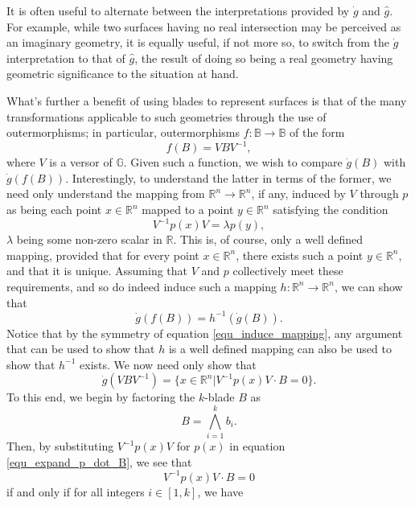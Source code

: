\documentclass{ecgd-l}
\theoremstyle{definition}
\theoremstyle{remark}
\numberwithin{equation}{section}
\newcommand{\R}{\mathbb{R}}
\newcommand{\B}{\mathbb{B}}
\newcommand{\G}{\mathbb{G}}
\newcommand{\gd}{\dot{g}}
\newcommand{\gh}{\hat{g}}
\begin{document}
It is often useful to alternate between the interpretations provided by $\gd$ and $\gh$.
For example, while two surfaces having no real intersection may be perceived as an imaginary
geometry, it is equally useful, if not more so, to switch from the $\gd$ interpretation to that of $\gh$,
the result of doing so being a real geometry having geometric significance to the situation at hand.

What's further a benefit of using blades to represent surfaces is that of the many transformations
applicable to such geometries through the use of outermorphisms; in particular,
outermorphisms $f:\B\to\B$ of the form
\begin{equation*}
f(B) = VBV^{-1},
\end{equation*}
where $V$ is a versor of $\G$.  Given such a function, we wish to
compare $\gd(B)$ with $\gd(f(B))$.  Interestingly, to understand
the latter in terms of the former, we need only understand the mapping from $\R^n\to\R^n$,
if any, induced by $V$ through $p$ as being each point $x\in\R^n$ mapped to a point
$y\in\R^n$ satisfying the condition
\begin{equation}\label{equ_induce_mapping}
V^{-1}p(x)V=\lambda p(y),
\end{equation}
$\lambda$ being some non-zero scalar in $\R$.
This is, of course, only a well defined mapping, provided that for every point $x\in\R^n$, there exists
such a point $y\in\R^n$, and that it is unique.
Assuming that $V$ and $p$ collectively meet these requirements, and so do indeed induce
such a mapping $h:\R^n\to\R^n$, we can show that
\begin{equation*}
\gd(f(B)) = h^{-1}(\gd(B)).
\end{equation*}
Notice that by the symmetry
of equation \eqref{equ_induce_mapping}, any argument that can be
used to show that $h$ is a well defined
mapping can also be used to show that $h^{-1}$ exists.
We now need only show that
\begin{equation*}
\gd(VBV^{-1})=\{x\in\R^n|V^{-1}p(x)V\cdot B=0\}.
\end{equation*}
To this end, we begin by factoring the $k$-blade $B$ as
\begin{equation*}
B = \bigwedge_{i=1}^k b_i.
\end{equation*}
Then, by substituting $V^{-1}p(x)V$ for $p(x)$ in equation \eqref{equ_expand_p_dot_B},
we see that
\begin{equation*}
V^{-1}p(x)V\cdot B=0
\end{equation*}
if and only if for all integers $i\in[1,k]$, we have
\end{document}

